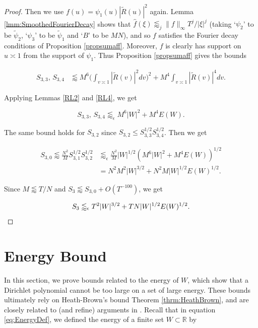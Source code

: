 \documentclass{amsart}
\theoremstyle{plain}
\numberwithin{equation}{section}
\renewcommand{\tilde}{\widetilde}
\begin{document}
\begin{proof}
Then we use $f(u) = \psi_1(u) |\tilde{R}(u)|^2$ again.  Lemma \ref{lmm:SmoothedFourierDecay} shows that $\widehat{f}(\xi)\lessapprox_j \| f\|_\infty T^j/|\xi|^j $ (taking `$\psi_2$' to be $\widetilde{\psi}_2$,  `$\psi_3$' to be $\widetilde{\psi}_1$ and `$B$' to be $MN$), and so $f$ satisfies the Fourier decay conditions of Proposition \ref{propsumaff}. Moreover, $f$ is clearly has support on $u\asymp 1$ from the support of $\psi_1$. Thus Proposition \ref{propsumaff} gives the bounds

\begin{align*}
 S_{3,3}, \, S_{3,4}
 &\lessapprox M^6 \Big( \int_{v \asymp 1} |\tilde{R}(v)|^2 dv \Big)^2 + M^4 \int_{v \asymp 1} |\tilde{R}(v)|^4 dv .
 \end{align*}

Applying Lemmas \ref{RL2} and \ref{RL4}, we get

\[ S_{3,3}, \,S_{3,4}  \lessapprox_\epsilon M^6 |W|^2 + M^4 E(W). \]

The same bound holds for $S_{3,2}$ since $S_{3,2} \le S_{3,3}^{1/2} S_{3,4}^{1/2}$.    Then we get

\begin{align*}
 S_{3,0} \lessapprox \frac{N^2}{M} S_{3,1}^{1/2} S_{3,2}^{1/2} &\lessapprox_\epsilon \frac{N^2}{M} |W|^{1/2} (M^6 |W|^2 + M^4 E(W))^{1/2} \\
 &= N^2 M^2 |W|^{3/2} + N^2 M |W|^{1/2} E(W)^{1/2}. 
 \end{align*}

Since $M \lessapprox T/N$ and $S_3\lessapprox S_{3,0}+O(T^{-100})$, we get


\[ S_3 \lessapprox_\epsilon T^2 |W|^{3/2} + T N  |W|^{1/2} E(W)^{1/2}. \qedhere\]


\end{proof}

%
%
%
%


\section{Energy Bound}\label{sec:Energy}

In this section, we prove bounds related to the energy of $W$,  which show that a Dirichlet polynomial cannot be too large on a set of large energy. These bounds ultimately rely on Heath-Brown's bound Theorem \ref{thrm:HeathBrown}, and are closely related to (and refine) arguments in \cite{HB2}. Recall that in equation \eqref{eq:EnergyDef}, we defined the energy of a finite set $W \subset \mathbb{R}$ by
\end{document}
